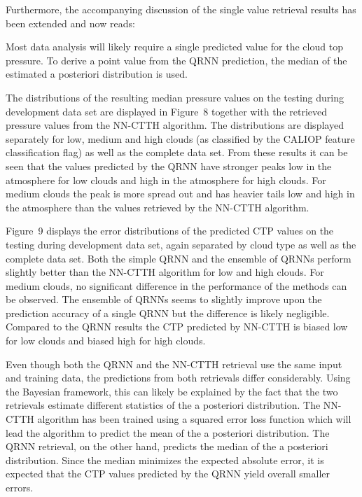 \documentclass[journal abbreviation, manuscript]{copernicus}
\begin{document}
\vspace{1em}

Furthermore, the accompanying discussion of the single value retrieval results
has been extended and now reads:

\vspace{1em}

\begin{em}
Most data analysis will likely require a single predicted value for the cloud top
pressure. To derive a point value from the QRNN prediction, the median of the
estimated a posteriori distribution is used.

The distributions of the resulting median pressure values 
on the testing during development data set are displayed in
Figure~8 together with the retrieved pressure
values from the NN-CTTH algorithm. The distributions are displayed
separately for low, medium and high clouds (as classified by the CALIOP
feature classification flag) as well as the complete data set. From these
results it can be seen that the values predicted by the QRNN have stronger peaks
low in the atmosphere for low clouds and high in the atmosphere for
high clouds. For medium clouds the peak is more spread out and has heavier
tails low and high in the atmosphere than the values retrieved by the NN-CTTH
algorithm.

Figure~9 displays the error distributions of the predicted
CTP values on the testing during development data set, again separated by
cloud type as well as the complete data set. Both the simple QRNN and the ensemble
of QRNNs perform slightly better than the NN-CTTH algorithm for low and high clouds.
For medium clouds, no significant difference in the performance of the methods can
be observed. The ensemble of QRNNs seems to slightly improve upon the prediction
accuracy of a single QRNN but the difference is likely negligible. Compared to
the QRNN results the CTP predicted by NN-CTTH is biased low for low clouds and
biased high for high clouds.

Even though both the QRNN and the NN-CTTH retrieval use the same input and
training data, the predictions from both retrievals differ considerably. Using
the Bayesian framework, this can likely be explained by the fact that the two
retrievals estimate different statistics of the a posteriori distribution. The
NN-CTTH algorithm has been trained using a squared error loss function which
will lead the algorithm to predict the mean of the a posteriori distribution.
The QRNN retrieval, on the other hand, predicts the median of the a posteriori
distribution. Since the median minimizes the expected absolute error, it is
expected that the CTP values predicted by the QRNN yield overall smaller errors.
\end{em}
\end{document}
